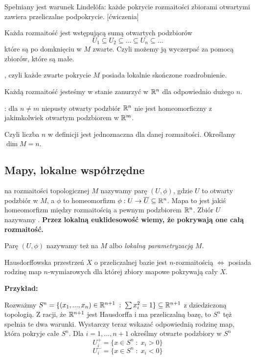 \smallskip

\indent \point Spełniany jest warunek Lindel\"ofa: każde pokrycie rozmaitości zbiorami otwartymi zawiera przeliczalne podpokrycie. [ćwiczenia]

\indent \point Każda rozmaitość jest wstępującą sumą otwartych podzbiorów
$$U_1\subseteq U_2\subseteq ...\subseteq U_n\subseteq...$$
które są po domknięciu w $M$ zwarte. Czyli możemy ją wyczerpać za pomocą zbiorów, które są małe.

\indent \point {}, czyli każde zwarte pokrycie $M$ posiada lokalnie skończone rozdrobnienie.

\indent \point Każdą rozmaitość jesteśmy w stanie zanurzyć w $\mathbb{R}^n$ dla odpowiednio dużego $n$.
\medskip

\smallskip

\indent \point {}: dla $n\neq m$ niepusty otwarty podzbiór $\mathbb{R}^n$ nie jest homeomorficzny z jakimkolwiek otwartym podzbiorem w $\mathbb{R}^m$. 

\indent \point Czyli liczba $n$ w definicji jest jednoznaczna dla danej rozmaitości. Określamy  $\dim M=n$.

\subsection{Mapy, lokalne współrzędne}

 na rozmaitości topologicznej $M$ nazywamy parę $(U, \phi)$, gdzie $U$ to otwarty podzbiór w $M$, a $\phi$ to homeomorfizm $\phi:U\to \overline U\subseteq \mathbb{R}^n$. Mapa to jest jakiś homeomorfizm między rozmaitością a pewnym podzbiorem $\mathbb{R}^n$. Zbiór $U$ nazywamy . \textbf{Przez lokalną euklidesowość wiemy, że pokrywają one całą rozmaitość.} 

Parę $(U, \phi)$ nazywamy też  na $M$ albo \emph{lokalną parametryzacją} $M$.
\smallskip

\begin{fakt}
    Hausdorffowska przestrzeń $X$ o przeliczalnej bazie jest $n$-rozmaitością $\iff$ posiada rodzinę map $n$-wymiarowych dla której zbiory mapowe pokrywają cały $X$.
\end{fakt}

\textbf{\large Przykład:} 

Rozważmy $S^n=\{(x_1,...,x_n)\in\mathbb{R}^{n+1}\;:\;\sum x_i^2=1\}\subseteq \mathbb{R}^{n+1}$ z dziedziczoną topologią. Z racji, że $\mathbb{R}^{n+1}$ jest Hausdorffa i ma przeliczalną bazę, to $S^n$ tęż spełnia te dwa warunki. Wystarczy teraz wskazać odpowiednią rodzinę map, która pokryje całe $S^n$. Dla $i=1,..., n+1$ określmy otwarte podzbiory w $S^n$
$$U_i^+=\{x\in S^n\;:\;x_i>0\}$$
$$U_i^-=\{x\in S^n\;:\;x_i<0\}$$

